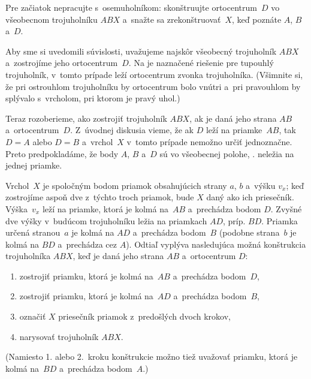{%
\napad
Pre začiatok nepracujte s~osemuholníkom: skonštruujte ortocentrum~$D$
vo všeobecnom trojuholníku $ABX$ a~snažte sa zrekonštruovať~$X$, keď poznáte $A$,
$B$ a~$D$.

\riesenie
Aby sme si uvedomili súvislosti,
uvažujeme najskôr všeobecný trojuholník $ABX$ a~zostrojíme jeho ortocentrum~$D$.
Na \obr{} je naznačené riešenie pre tupouhlý trojuholník, v~tomto
prípade leží ortocentrum zvonka trojuholníka.
(Všimnite si, že pri ostrouhlom trojuholníku by ortocentrum bolo vnútri
a~pri pravouhlom by splývalo s~vrcholom, pri ktorom je pravý uhol.)

Teraz rozoberieme, ako zostrojiť trojuholník $ABX$, ak je daná jeho strana
$AB$ a~ortocentrum~$D$.
Z~úvodnej diskusia vieme, že ak $D$ leží na priamke~$AB$, tak $D=A$ alebo
$D=B$ a~vrchol~$X$ v~tomto prípade nemožno určiť jednoznačne.
Preto predpokladáme, že body $A$, $B$ a~$D$ sú vo všeobecnej polohe,
\tj. neležia na jednej priamke.

Vrchol~$X$ je spoločným bodom priamok obsahujúcich strany $a$, $b$ a~výšku
$v_x$;
keď zostrojíme aspoň dve z~týchto troch priamok, bude $X$ daný ako ich
priesečník.
Výška~$v_x$ leží na priamke, ktorá je kolmá na~$AB$ a~prechádza bodom $D$.
Zvyšné dve výšky v~budúcom trojuholníku ležia na priamkach $AD$, príp. $BD$.
Priamka určená stranou~$a$ je kolmá na $AD$ a~prechádza bodom~$B$ (podobne
strana~$b$ je kolmá na $BD$ a~prechádza cez $A$).
Odtiaľ vyplýva nasledujúca možná konštrukcia trojuholníka
$ABX$, keď je daná jeho strana $AB$ a~ortocentrum $D$:
\begin{enumerate}
\item zostrojiť priamku, ktorá je kolmá na~$AB$ a~prechádza bodom~$D$,
\item zostrojiť priamku, ktorá je kolmá na~$AD$ a~prechádza bodom~$B$,
\item označiť $X$ priesečník priamok z~predošlých dvoch krokov,
\item narysovať trojuholník $ABX$.
\end{enumerate}
\noindent
(Namiesto 1. alebo 2.~kroku konštrukcie možno tiež
uvažovať priamku, ktorá je kolmá na~$BD$ a~prechádza bodom~$A$.)

}
